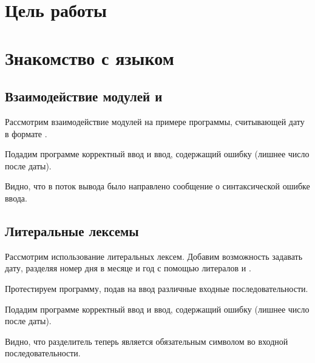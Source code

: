 





\tableofcontents
\newpage

\section{Цель работы}

\section{Знакомство с языком }

\subsection{Взаимодействие модулей  и }

Рассмотрим взаимодействие модулей на примере программы, считывающей дату в формате .



Подадим программе корректный ввод и ввод, содержащий ошибку (лишнее число после даты).



Видно, что в поток вывода было направлено сообщение о синтаксической ошибке ввода.

\subsection{Литеральные лексемы}

Рассмотрим использование литеральных лексем. Добавим возможность задавать дату, разделяя номер дня в месяце и год с помощью литералов  и . 



Протестируем программу, подав на ввод различные входные последовательности.

Подадим программе корректный ввод и ввод, содержащий ошибку (лишнее число после даты).




Видно, что разделитель теперь является обязательным символом во входной последовательности.

